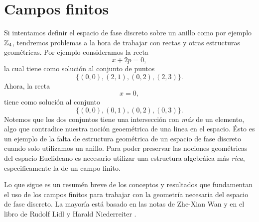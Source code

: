 \section{Campos finitos}

Si intentamos definir el espacio de fase discreto sobre un
anillo como por ejemplo $\operatorname{\mathbb{Z}}_4$, tendremos problemas a la
hora de trabajar con rectas y otras estructuras geométricas.
Por ejemplo consideramos la recta
\[
  x + 2p = 0,
\]
la cual tiene como solución al conjunto de puntos
\begin{equation}
  \label{eqn:ap_fields_1}
  \{(0,0), (2,1), (0,2), (2,3)\}.
\end{equation} 
Ahora, la recta 
\[
  x = 0,
\] 
tiene como solución al conjunto
\begin{equation}
  \label{eqn:ap_fields_2}
  \{(0,0), (0,1), (0,2), (0,3)\}.
\end{equation} 
Notemos que los dos conjuntos tiene una intersección con
\textit{más} de un elemento, algo que contradice nuestra
noción geoemétrica de una linea en el espacio. Ésto es un
ejemplo de la falta de estructura geométrica de un espacio
de fase discreto cuando solo utilizamos un anillo. Para
poder preservar las nociones geométricas del espacio
Euclideano es necesario utilizar una estructura algebráica
más \textit{rica}, especificamente la de un campo finito.

Lo que sigue es un resumén breve de los conceptos y
resultados que fundamentan el uso de los campos finitos para
trabajar con la geometría necesaria del espacio de fase
discreto. La mayoría está basado en las notas de Zhe-Xian
Wan \cite{wan} y en el libro de Rudolf Lidl y Harald
Niederreiter \cite{lidl1994}.

